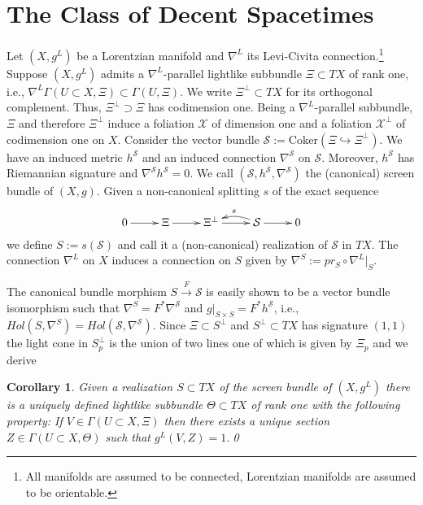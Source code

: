 \documentclass[a4paper,10pt,twoside]{amsart}
\newtheorem{corollary}[theorem]{Corollary}
\theoremstyle{definition}
\theoremstyle{remark}
\numberwithin{equation}{section}
\begin{document}
\section{The Class of Decent Spacetimes}
Let $(X,g^{L})$ be a Lorentzian manifold and $\nabla^{L}$ its Levi-Civita connection.\footnote{All manifolds are assumed to be connected,
												Lorentzian manifolds are assumed to be orientable.}
Suppose $(X,g^{L})$ admits a $\nabla^{L}$-parallel lightlike subbundle $\Xi \subset TX$ of rank one, i.e.,
$\nabla^{L}\Gamma(U \subset X,\Xi) \subset \Gamma(U,\Xi)$. We write $\Xi^{\perp} \subset TX$ for its orthogonal complement. Thus,
$\Xi^{\perp} \supset \Xi$ has codimension one. Being a $\nabla^{L}$-parallel subbundle, $\Xi$ and therefore $\Xi^{\perp}$ induce a foliation
$\mathcal{X}$ of dimension one and a foliation $\mathcal{X}^{\perp}$ of codimension one on $X$. Consider the vector bundle
$\mathcal{S}:= \mbox{Coker}(\Xi \hookrightarrow \Xi^{\perp})$. We have an induced metric $h^{\mathcal{S}}$ and an induced connection
$\nabla^{\mathcal{S}}$ on $\mathcal{S}$. Moreover, $h^{\mathcal{S}}$ has Riemannian signature and
$\nabla^{\mathcal{S}}h^{\mathcal{S}}=0$. We call $(\mathcal{S},h^{\mathcal{S}},\nabla^{\mathcal{S}})$ the (canonical) screen bundle of $(X,g)$. Given a
non-canonical splitting $s$ of the exact sequence
\begin{equation*}
	\xymatrix{ 0 \ar[r] & \Xi \ar[r] & \Xi^{\perp} \ar[r] & \mathcal{S} \ar@/_/[l]_{s} \ar[r] & 0}
\end{equation*}
we define $S:=s(\mathcal{S})$ and call it a (non-canonical) realization of $\mathcal{S}$ in $TX$. The connection $\nabla^{L}$ on $X$ induces a connection
on $S$ given by $\nabla^{S} := pr_{S} \circ \nabla^{L}|_{S}$.\par
The canonical bundle morphism $S \stackrel{F}{\rightarrow} \mathcal{S}$ is easily shown to be a vector bundle isomorphism such that
$\nabla^{S} = F^{*}\nabla^{\mathcal{S}}$ and $g|_{S \times S}=F^{*}h^{\mathcal{S}}$, i.e., $Hol(S,\nabla^{S})=Hol(\mathcal{S},\nabla^{\mathcal{S}})$.
Since $\Xi \subset S^{\perp}$ and $S^{\perp} \subset TX$ has signature $(1,1)$ the light cone in $S^{\perp}_{p}$ is the union of two lines
one of which is given by $\Xi_{p}$ and we derive
\begin{corollary}\label{complementary-distrib}
	Given a realization $S \subset TX$ of the screen bundle of $(X,g^{L})$ there is a uniquely defined lightlike subbundle
	$\Theta \subset TX$ of rank one with the following property: If $V \in \Gamma(U \subset X,\Xi)$ then there exists a unique section
	$Z \in \Gamma(U \subset X,\Theta)$ such that $g^{L}(V,Z)=1$.\qed
\end{corollary}
\end{document}
